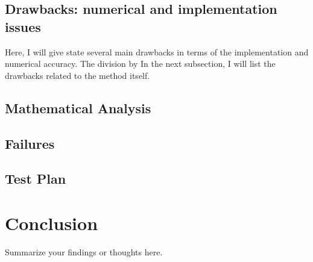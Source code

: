 \documentclass[12pt]{article}
\begin{document}


\subsection{Drawbacks: numerical and implementation issues}
Here, I will give state several main drawbacks in terms of the implementation and numerical accuracy. The division by
In the next subsection, I will list the drawbacks related to the method itself.
\subsection{Mathematical Analysis}
\subsection{Failures}
\subsection{Test Plan}

\section{Conclusion}
Summarize your findings or thoughts here.
\cite{apostol1985mathematical}


\end{document}
